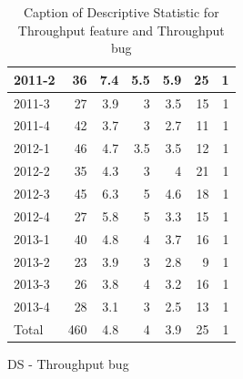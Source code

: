 \documentclass[UKenglish]{ifimaster}  %
\begin{document}
\begin{appendices}
\begin{table}[!htbp]
\begin{adjustwidth}{-2.5cm}{}
\begin{subfigure}[b]{0.3\textwidth}
{\begin{tabular}{ | l | r | r | r | r | r | r | }
 2011-2  & 36 & 7.4 & 5.5 & 5.9 & 25 & 1 \\ \hline
 2011-3  & 27 & 3.9 & 3 & 3.5 & 15 & 1 \\ \hline
 2011-4  & 42 & 3.7 & 3 & 2.7 & 11 & 1 \\ \hline
 2012-1  & 46 & 4.7 & 3.5 & 3.5 & 12 & 1 \\ \hline
 2012-2  & 35 & 4.3 & 3 & 4 & 21 & 1 \\ \hline
 2012-3  & 45 & 6.3 & 5 & 4.6 & 18 & 1 \\ \hline
 2012-4  & 27 & 5.8 & 5 & 3.3 & 15 & 1 \\ \hline
 2013-1  & 40 & 4.8 & 4 & 3.7 & 16 & 1 \\ \hline
 2013-2  & 23 & 3.9 & 3 & 2.8 & 9 & 1 \\ \hline
 2013-3  & 26 & 3.8 & 4 & 3.2 & 16 & 1 \\ \hline
 2013-4  & 28 & 3.1 & 3 & 2.5 & 13 & 1 \\ \hline
 Total  & 460 & 4.8 & 4 & 3.9 & 25 & 1 \\ \hline
\end{tabular}
}
\caption{DS - Throughput bug}
 \label{DS:TPB:2}
\end{subfigure}
\end{adjustwidth}
\caption[Optional caption for list of figures]{Caption of Descriptive Statistic for Throughput feature and Throughput bug }
\label{DS:2:2}
\end{table}





\end{appendices}
\end{document}
